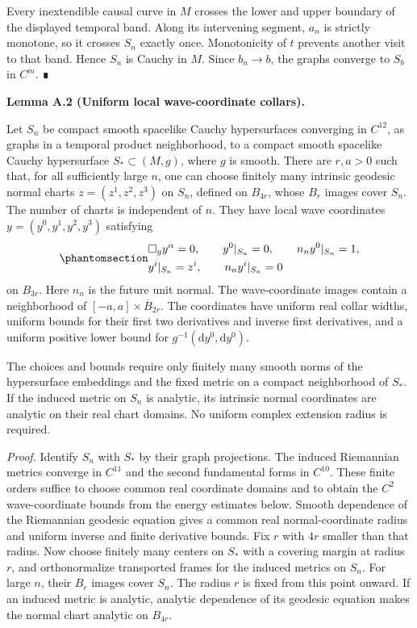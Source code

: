 \documentclass[
  english,
  11pt,
  reqno]{amsart}
\makeatletter
\newcommand{\pandocstatementheading}[1]{%
  \par\if@nobreak\else
    \addpenalty{\@beginparpenalty}%
    \addvspace{.5\baselineskip plus .2\baselineskip minus .2\baselineskip}%
  \fi
  {\normalfont\bfseries #1\par}%
  \nobreak\@afterindenttrue\@afterheading
}
\makeatother
\begin{document}
Every inextendible causal curve in \(M\) crosses the lower and upper
boundary of the displayed temporal band. Along its intervening segment,
\(a_n\) is strictly monotone, so it crosses \(S_n\) exactly once.
Monotonicity of \(t\) prevents another visit to that band. Hence \(S_n\)
is Cauchy in \(M\). Since \(b_n\to b\), the graphs converge to \(S_b\)
in \(C^m\). ∎

\pandocstatementheading{\protect{}\label{lem:uniform-local-wave-coordinate-collars}Lemma A.2 (Uniform local wave-coordinate collars).}

Let \(S_n\) be compact smooth spacelike Cauchy hypersurfaces converging
in \(C^{12}\), as graphs in a temporal product neighborhood, to a
compact smooth spacelike Cauchy hypersurface \(S_*\subset(M,g)\), where
\(g\) is smooth. There are \(r,a>0\) such that, for all sufficiently
large \(n\), one can choose finitely many intrinsic geodesic normal
charts \(z=(z^1,z^2,z^3)\) on \(S_n\), defined on \(B_{4r}\), whose
\(B_r\) images cover \(S_n\). The number of charts is independent of
\(n\). They have local wave coordinates \(y=(y^0,y^1,y^2,y^3)\)
satisfying
\begin{equation}\protect\phantomsection\label{eq:analytic-persistence-wave-coordinate-data}{
\begin{aligned}
&\Box_g y^\alpha=0,\qquad y^0|_{S_n}=0,
\qquad n_n y^0|_{S_n}=1,\\
&y^i|_{S_n}=z^i,\qquad n_n y^i|_{S_n}=0
\end{aligned}
}\end{equation} on \(B_{3r}\). Here \(n_n\) is the future unit normal.
The wave-coordinate images contain a neighborhood of
\([-a,a]\times\overline B_{2r}\). The coordinates have uniform real
collar widths, uniform bounds for their first two derivatives and
inverse first derivatives, and a uniform positive lower bound for
\(g^{-1}(\mathrm dy^0,\mathrm dy^0)\).

The choices and bounds require only finitely many smooth norms of the
hypersurface embeddings and the fixed metric on a compact neighborhood
of \(S_*\). If the induced metric on \(S_n\) is analytic, its intrinsic
normal coordinates are analytic on their real chart domains. No uniform
complex extension radius is required.

\emph{Proof.} Identify \(S_n\) with \(S_*\) by their graph projections.
The induced Riemannian metrics converge in \(C^{11}\) and the second
fundamental forms in \(C^{10}\). These finite orders suffice to choose
common real coordinate domains and to obtain the \(C^2\) wave-coordinate
bounds from the energy estimates below. Smooth dependence of the
Riemannian geodesic equation gives a common real normal-coordinate
radius and uniform inverse and finite derivative bounds. Fix \(r\) with
\(4r\) smaller than that radius. Now choose finitely many centers on
\(S_*\) with a covering margin at radius \(r\), and orthonormalize
transported frames for the induced metrics on \(S_n\). For large \(n\),
their \(B_r\) images cover \(S_n\). The radius \(r\) is fixed from this
point onward. If an induced metric is analytic, analytic dependence of
its geodesic equation makes the normal chart analytic on \(B_{4r}\).
\end{document}
